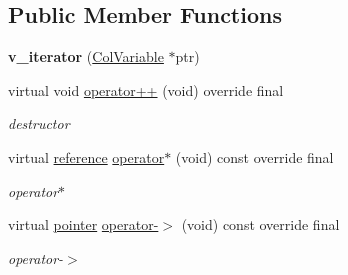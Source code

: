 \subsection*{Public Member Functions}
\begin{DoxyCompactItemize}
\item 
\mbox{\label{class_s_m_spp__di__unipi__it_1_1_one_var_constraint_1_1v__iterator_a0fd40b9e9dd0ed7e968d23f4ef98ad4d}} 
{\bfseries v\+\_\+iterator} (\mbox{\hyperlink{class_s_m_spp__di__unipi__it_1_1_col_variable}{Col\+Variable}} $\ast$ptr)
\item 
virtual void \mbox{\hyperlink{class_s_m_spp__di__unipi__it_1_1_one_var_constraint_1_1v__iterator_af860fe44bc54c0cbca8e733ab0e954e0}{operator++}} (void) override final
\begin{DoxyCompactList}\small\item\em destructor \end{DoxyCompactList}\item 
\mbox{\label{class_s_m_spp__di__unipi__it_1_1_one_var_constraint_1_1v__iterator_aea4d50ffc7b90999612dafe5edb8ca59}} 
virtual \mbox{\hyperlink{class_s_m_spp__di__unipi__it_1_1_variable}{reference}} \mbox{\hyperlink{class_s_m_spp__di__unipi__it_1_1_one_var_constraint_1_1v__iterator_aea4d50ffc7b90999612dafe5edb8ca59}{operator$\ast$}} (void) const override final
\begin{DoxyCompactList}\small\item\em operator$\ast$ \end{DoxyCompactList}\item 
\mbox{\label{class_s_m_spp__di__unipi__it_1_1_one_var_constraint_1_1v__iterator_af090a4094bcbcae8966745a92278976b}} 
virtual \mbox{\hyperlink{class_s_m_spp__di__unipi__it_1_1_variable}{pointer}} \mbox{\hyperlink{class_s_m_spp__di__unipi__it_1_1_one_var_constraint_1_1v__iterator_af090a4094bcbcae8966745a92278976b}{operator-\/$>$}} (void) const override final
\begin{DoxyCompactList}\small\item\em operator-\/$>$ \end{DoxyCompactList}\item 
\mbox{\label{class_s_m_spp__di__unipi__it_1_1_one_var_constraint_1_1v__iterator_a0dc0c588cd40c35cea17618336da30c3}} 

\end{DoxyCompactItemize}
